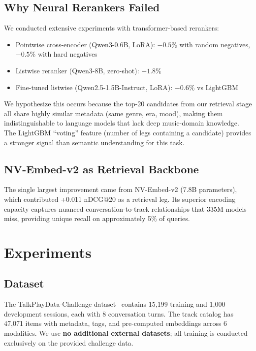 \documentclass[sigconf]{acmart}
\begin{document}
\subsection{Why Neural Rerankers Failed}

We conducted extensive experiments with transformer-based rerankers:
\begin{itemize}
    \item Pointwise cross-encoder (Qwen3-0.6B, LoRA): $-0.5\%$ with random negatives, $-0.5\%$ with hard negatives
    \item Listwise reranker (Qwen3-8B, zero-shot): $-1.8\%$
    \item Fine-tuned listwise (Qwen2.5-1.5B-Instruct, LoRA): $-0.6\%$ vs LightGBM
\end{itemize}

We hypothesize this occurs because the top-20 candidates from our retrieval stage all share highly similar metadata (same genre, era, mood), making them indistinguishable to language models that lack deep music-domain knowledge. The LightGBM ``voting'' feature (number of legs containing a candidate) provides a stronger signal than semantic understanding for this task.

\subsection{NV-Embed-v2 as Retrieval Backbone}

The single largest improvement came from NV-Embed-v2 (7.8B parameters), which contributed +0.011 nDCG@20 as a retrieval leg. Its superior encoding capacity captures nuanced conversation-to-track relationships that 335M models miss, providing unique recall on approximately 5\% of queries.

\section{Experiments}

\subsection{Dataset}

The TalkPlayData-Challenge dataset~\cite{talkplay2026} contains 15,199 training and 1,000 development sessions, each with 8 conversation turns. The track catalog has 47,071 items with metadata, tags, and pre-computed embeddings across 6 modalities. We use \textbf{no additional external datasets}; all training is conducted exclusively on the provided challenge data.
\end{document}
